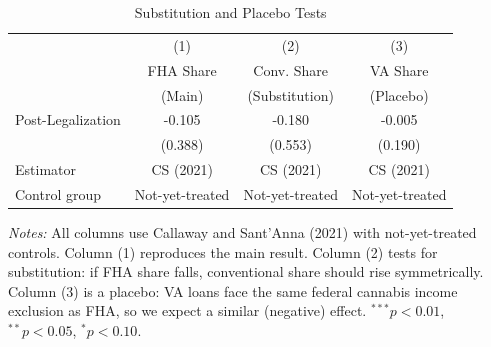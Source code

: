 \begin{table}[t]
\centering
\caption{Substitution and Placebo Tests}
\label{tab:placebo}
\begin{tabular}{lccc}
\hline\hline
 & (1) & (2) & (3) \\
 & FHA Share & Conv. Share & VA Share \\
 & (Main) & (Substitution) & (Placebo) \\
\hline
\addlinespace
Post-Legalization & -0.105 & -0.180 & -0.005 \\
 & (0.388) & (0.553) & (0.190) \\
\addlinespace
Estimator & CS (2021) & CS (2021) & CS (2021) \\
Control group & Not-yet-treated & Not-yet-treated & Not-yet-treated \\
\hline\hline
\end{tabular}
\begin{tablenotes}
\small
\item \textit{Notes:} All columns use Callaway and Sant'Anna (2021) with not-yet-treated controls. Column (1) reproduces the main result. Column (2) tests for substitution: if FHA share falls, conventional share should rise symmetrically. Column (3) is a placebo: VA loans face the same federal cannabis income exclusion as FHA, so we expect a similar (negative) effect. $^{***}p<0.01$, $^{**}p<0.05$, $^{*}p<0.10$.
\end{tablenotes}
\end{table}
